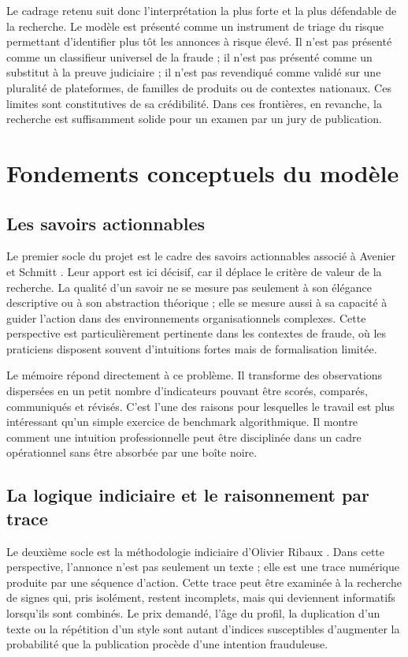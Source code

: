 \documentclass[10pt,a4paper]{article}
\begin{document}
Le cadrage retenu suit donc l'interprétation la plus forte et la plus défendable de la recherche. Le modèle est présenté comme un instrument de triage du risque permettant d'identifier plus tôt les annonces à risque élevé. Il n'est pas présenté comme un classifieur universel de la fraude ; il n'est pas présenté comme un substitut à la preuve judiciaire ; il n'est pas revendiqué comme validé sur une pluralité de plateformes, de familles de produits ou de contextes nationaux. Ces limites sont constitutives de sa crédibilité. Dans ces frontières, en revanche, la recherche est suffisamment solide pour un examen par un jury de publication.

\section{Fondements conceptuels du modèle}
\subsection{Les savoirs actionnables}
Le premier socle du projet est le cadre des savoirs actionnables associé à Avenier et Schmitt \cite{avenier2007a,avenier2007b}. Leur apport est ici décisif, car il déplace le critère de valeur de la recherche. La qualité d'un savoir ne se mesure pas seulement à son élégance descriptive ou à son abstraction théorique ; elle se mesure aussi à sa capacité à guider l'action dans des environnements organisationnels complexes. Cette perspective est particulièrement pertinente dans les contextes de fraude, où les praticiens disposent souvent d'intuitions fortes mais de formalisation limitée.

Le mémoire répond directement à ce problème. Il transforme des observations dispersées en un petit nombre d'indicateurs pouvant être scorés, comparés, communiqués et révisés. C'est l'une des raisons pour lesquelles le travail est plus intéressant qu'un simple exercice de benchmark algorithmique. Il montre comment une intuition professionnelle peut être disciplinée dans un cadre opérationnel sans être absorbée par une boîte noire.

\subsection{La logique indiciaire et le raisonnement par trace}
Le deuxième socle est la méthodologie indiciaire d'Olivier Ribaux \cite{ribaux2023}. Dans cette perspective, l'annonce n'est pas seulement un texte ; elle est une trace numérique produite par une séquence d'action. Cette trace peut être examinée à la recherche de signes qui, pris isolément, restent incomplets, mais qui deviennent informatifs lorsqu'ils sont combinés. Le prix demandé, l'âge du profil, la duplication d'un texte ou la répétition d'un style sont autant d'indices susceptibles d'augmenter la probabilité que la publication procède d'une intention frauduleuse.
\end{document}

